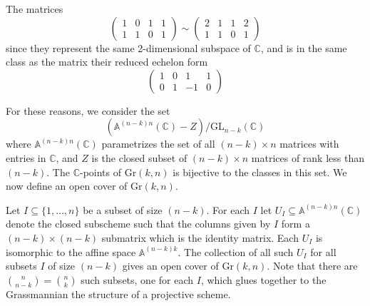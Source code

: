 \begin{example}
    The matrices 
    \[\begin{pmatrix}1 & 0 & 1 & 1 \\1 & 1 & 0 & 1\end{pmatrix} \sim \begin{pmatrix}2 & 1 & 1 & 2 \\1 & 1 & 0 & 1\end{pmatrix}\] 
    since they represent the same 2-dimensional subspace of $\mathbb{C}$, and is in the same class as the matrix their reduced echelon form 
    \[\begin{pmatrix}1 & 0 & 1 & 1 \\0 & 1 & -1 & 0\end{pmatrix}\]
\end{example}

For these reasons, we consider the set
\[(\mathbb{A}^{(n-k)n}(\mathbb{C}) - Z)/\mathrm{GL}_{n-k}(\mathbb{C})\]
where $\mathbb{A}^{(n-k)n}(\mathbb{C})$ parametrizes the set of all $(n-k) \times n$ matrices with entries in $\mathbb{C}$, and $Z$ is the closed subset of $(n-k) \times n$ matrices of rank less than $(n-k)$. The $\mathbb{C}$-points of $\mathrm{Gr}(k,n)$ is bijective to the classes in this set. We now define an open cover of $\mathrm{Gr}(k,n)$.

Let $I \subseteq \{1,\ldots,n\}$ be a subset of size $(n-k)$. For each $I$ let $U_I \subseteq \mathbb{A}^{(n-k)n}(\mathbb{C})$ denote the closed subscheme such that the columns given by $I$ form a $(n-k)\times(n-k)$ submatrix which is the identity matrix. Each $U_I$ is isomorphic to the affine space $\mathbb{A}^{(n-k)k}$. The collection of all such $U_I$ for all subsets $I$ of size $(n-k)$ gives an open cover of $\mathrm{Gr}(k,n)$. Note that there are $\binom{n}{n-k} = \binom{n}{k}$ such subsets, one for each $I$, which glues together to the Grassmannian the structure of a projective scheme.

